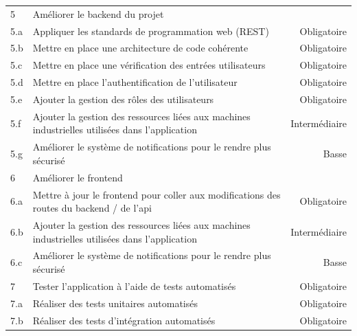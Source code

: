 \documentclass[
    iai, %
    il, %
]{heig-tb}
\begin{document}
\begin{table}[h]
\begin{center}
\begin{tabularx}{1.0\textwidth} {l|X|r}
            5   & Améliorer le backend du projet                                                                                         &               \\
            5.a & Appliquer les standards de programmation web (REST)                                                                    & Obligatoire   \\
            5.b & Mettre en place une architecture de code cohérente                                                                     & Obligatoire   \\
            5.c & Mettre en place une vérification des entrées utilisateurs                                                              & Obligatoire   \\
            5.d & Mettre en place l'authentification de l'utilisateur                                                                    & Obligatoire   \\
            5.e & Ajouter la gestion des rôles des utilisateurs                                                                          & Obligatoire   \\
            5.f & Ajouter la gestion des ressources liées aux machines industrielles utilisées dans l'application                        & Intermédiaire \\
            5.g & Améliorer le système de notifications pour le rendre plus sécurisé                                                     & Basse         \\
            6   & Améliorer le frontend                                                                                                  &               \\
            6.a & Mettre à jour le frontend pour coller aux modifications des routes du backend / de l'api                               & Obligatoire   \\
            6.b & Ajouter la gestion des ressources liées aux machines industrielles utilisées dans l'application                        & Intermédiaire \\
            6.c & Améliorer le système de notifications pour le rendre plus sécurisé                                                     & Basse         \\
            7   & Tester l'application à l'aide de tests automatisés                                                                     & Obligatoire   \\
            7.a & Réaliser des tests unitaires automatisés                                                                               & Obligatoire   \\
            7.b & Réaliser des tests d'intégration automatisés                                                                           & Obligatoire   \\
        \end{tabularx}
    \end{center}
\end{table}
\end{document}
